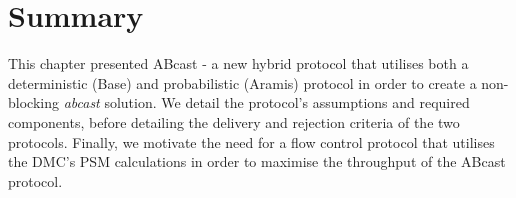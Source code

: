 \section{Summary}
This chapter presented \textsf{ABcast} - a new hybrid protocol that utilises both a deterministic (\textsf{Base}) and probabilistic (\textsf{Aramis}) protocol in order to create a non-blocking \emph{abcast} solution.  We detail the protocol's assumptions and required components, before detailing the delivery and rejection criteria of the two protocols.  Finally, we motivate the need for a flow control protocol that utilises the DMC's PSM calculations in order to maximise the throughput of the \textsf{ABcast}  protocol.  